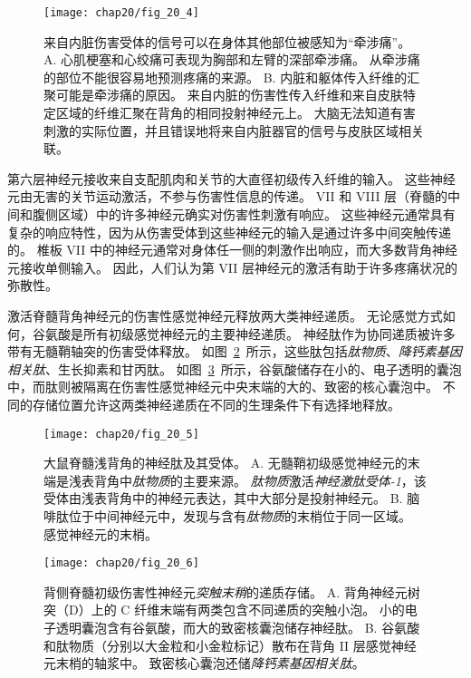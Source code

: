 \begin{figure}[htbp]
	\centering
	\texttt{[image: chap20/fig\_20\_4]}
	\caption{来自内脏伤害受体的信号可以在身体其他部位被感知为“牵涉痛”。
		A. 心肌梗塞和心绞痛可表现为胸部和左臂的深部牵涉痛。
		从牵涉痛的部位不能很容易地预测疼痛的来源。
		B. 内脏和躯体传入纤维的汇聚可能是牵涉痛的原因。
		来自内脏的伤害性传入纤维和来自皮肤特定区域的纤维汇聚在背角的相同投射神经元上。
		大脑无法知道有害刺激的实际位置，并且错误地将来自内脏器官的信号与皮肤区域相关联\cite{fields1987painful}。}
	\label{fig:20_4}
\end{figure}


第六层神经元接收来自支配肌肉和关节的大直径初级传入纤维的输入。
这些神经元由无害的关节运动激活，不参与伤害性信息的传递。
VII 和 VIII 层（脊髓的中间和腹侧区域）中的许多神经元确实对伤害性刺激有响应。
这些神经元通常具有复杂的响应特性，因为从伤害受体到这些神经元的输入是通过许多中间突触传递的。
椎板 VII 中的神经元通常对身体任一侧的刺激作出响应，而大多数背角神经元接收单侧输入。
因此，人们认为第 VII 层神经元的激活有助于许多疼痛状况的弥散性。


激活脊髓背角神经元的伤害性感觉神经元释放两大类神经递质。
无论感觉方式如何，谷氨酸是所有初级感觉神经元的主要神经递质。
神经肽作为协同递质被许多带有无髓鞘轴突的伤害受体释放。
如图~\ref{fig:20_5}~所示，这些肽包括\textit{肽物质}、\textit{降钙素基因相关肽}、生长抑素和甘丙肽。
如图~\ref{fig:20_6}~所示，谷氨酸储存在小的、电子透明的囊泡中，而肽则被隔离在伤害性感觉神经元中央末端的大的、致密的核心囊泡中。
不同的存储位置允许这两类神经递质在不同的生理条件下有选择地释放。


\begin{figure}[htbp]
	\centering
	\texttt{[image: chap20/fig\_20\_5]}
	\caption{大鼠脊髓浅背角的神经肽及其受体。
		A. 无髓鞘初级感觉神经元的末端是浅表背角中\textit{肽物质}的主要来源。
		\textit{肽物质}激活\textit{神经激肽受体-1}，该受体由浅表背角中的神经元表达，其中大部分是投射神经元。
		B. 脑啡肽位于中间神经元中，发现与含有\textit{肽物质}的末梢位于同一区域。
		感觉神经元的末梢。}
	\label{fig:20_5}
\end{figure}


\begin{figure}[htbp]
	\centering
	\texttt{[image: chap20/fig\_20\_6]}
	\caption{背侧脊髓初级伤害性神经元\textit{突触末稍}的递质存储。
		A. 背角神经元树突（D）上的 C 纤维末端有两类包含不同递质的突触小泡。
		小的电子透明囊泡含有谷氨酸，而大的致密核囊泡储存神经肽。
		B. 谷氨酸和肽物质（分别以大金粒和小金粒标记）散布在背角 II 层感觉神经元末梢的轴浆中。
		致密核心囊泡还储\textit{降钙素基因相关肽}\cite{de1990ultrastructural}。}
	\label{fig:20_6}
\end{figure}


